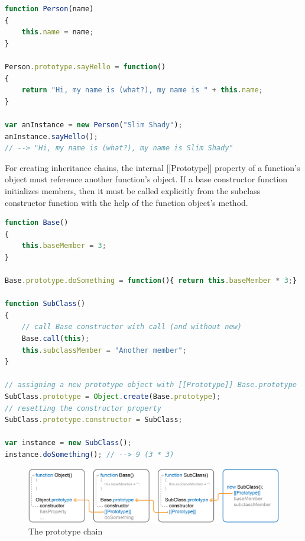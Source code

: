 \SingleSpacing
\begin{lstlisting}[language=JavaScript, caption=Classes in \myProperName{JavaScript}, label=JSClasses]
function Person(name)
{
	this.name = name;
}

Person.prototype.sayHello = function()
{
	return "Hi, my name is (what?), my name is " + this.name;
}

var anInstance = new Person("Slim Shady");
anInstance.sayHello();
// --> "Hi, my name is (what?), my name is Slim Shady"
\end{lstlisting}
\OnehalfSpacing

For creating inheritance chains, the internal [[Prototype]] property of a function's \linebreak{} object must reference another function's  object. If a base constructor function initializes members, then it must be called explicitly from the subclass constructor function with the help of the function object's  method.

\SingleSpacing
\begin{lstlisting}[language=JavaScript, caption=Prototype-based inheritance in \myProperName{JavaScript}, label=JSClasses]
function Base()
{
	this.baseMember = 3;
}

Base.prototype.doSomething = function(){ return this.baseMember * 3;}

function SubClass()
{
	// call Base constructor with call (and without new)
	Base.call(this);
	this.subclassMember = "Another member";
}

// assigning a new prototype object with [[Prototype]] Base.prototype
SubClass.prototype = Object.create(Base.prototype);
// resetting the constructor property
SubClass.prototype.constructor = SubClass;

var instance = new SubClass();
instance.doSomething(); // --> 9 (3 * 3)

\end{lstlisting}
\OnehalfSpacing

\vspace{10pt}
\begin{figure}[h] %
	\centering
		\includegraphics[scale=0.32]{Images/PrototypeChain.png}
	\caption{The prototype chain}
	\label{fig:InheritanceWrapping}
\end{figure}

